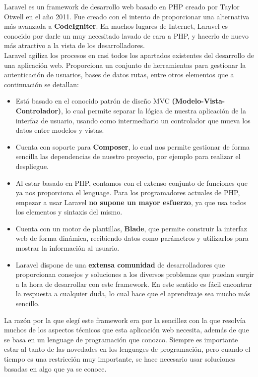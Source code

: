 Laravel es un framework de desarrollo web basado en PHP creado por Taylor Otwell en el año 2011. Fue creado con el intento de proporcionar una alternativa más avanzada a \textbf{CodeIgniter}. En muchos lugares de Internet, Laravel es conocido por darle un muy necesitado lavado de cara a PHP, y hacerlo de nuevo más atractivo a la vista de los desarrolladores.\\

Laravel agiliza los procesos en casi todos los apartados existentes del desarrollo de una aplicación web. Proporciona un conjunto de herramientas para gestionar la autenticación de usuarios, bases de datos rutas, entre otros elementos que a continuación se detallan:

\begin{itemize}
    \item Está basado en el conocido patrón de diseño MVC \textbf{(Modelo-Vista-Controlador)}, lo cual permite separar la lógica de nuestra aplicación de la interfaz de usuario, usando como intermediario un controlador que mueva los datos entre modelos y vistas.
    \item Cuenta con soporte para \textbf{Composer}, lo cual nos permite gestionar de forma sencilla las dependencias de nuestro proyecto, por ejemplo para realizar el despliegue.
    \item Al estar basado en PHP, contamos con el extenso conjunto de funciones que ya nos proporciona el lenguage. Para los programadores actuales de PHP, empezar a usar Laravel \textbf{no supone un mayor esfuerzo}, ya que usa todos los elementos y sintaxis del mismo.
    \item Cuenta con un motor de plantillas, \textbf{Blade}, que permite construir la interfaz web de forma dinámica, recibiendo datos como parámetros y utilizarlos para mostrar la información al usuario.
    \item Laravel dispone de una \textbf{extensa comunidad} de desarrolladores que proporcionan consejos y soluciones a los diversos problemas que puedan surgir a la hora de desarrollar con este framework. En este sentido es fácil encontrar la respuesta a cualquier duda, lo cual hace que el aprendizaje sea mucho más sencillo.
\end{itemize}

La razón por la que elegí este framework era por la sencillez con la que resolvía muchos de los aspectos técnicos que esta aplicación web necesita, además de que se basa en un lenguage de programación que conozco. Siempre es importante estar al tanto de las novedades en los lenguages de programación, pero cuando el tiempo es una restricción muy importante, se hace necesario usar soluciones basadas en algo que ya se conoce.

